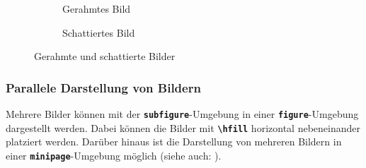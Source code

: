 \begin{figure}[H]
    \centering
    \begin{subfigure}{0.45\textwidth}
        \centering
        \caption{Gerahmtes Bild}
        \label{fig:gerahmtes_bild}
    \end{subfigure}
    \hfill
    \begin{subfigure}{0.45\textwidth}
        \centering
        \caption{Schattiertes Bild}
        \label{fig:schattiertes_bild}
    \end{subfigure}
    \caption{Gerahmte und schattierte Bilder}
    \label{fig:gerahmte_schattierte_bilder}
\end{figure}


\subsubsection{Parallele Darstellung von Bildern}
Mehrere Bilder können mit der \textbf{\texttt{subfigure}}-Umgebung in einer \textbf{\texttt{figure}}-Umgebung dargestellt werden. Dabei können die Bilder mit \textbf{\texttt{\textbackslash hfill}} horizontal nebeneinander platziert werden. Darüber hinaus ist die Darstellung von mehreren Bildern in einer \textbf{\texttt{minipage}}-Umgebung möglich (siehe auch: ).

